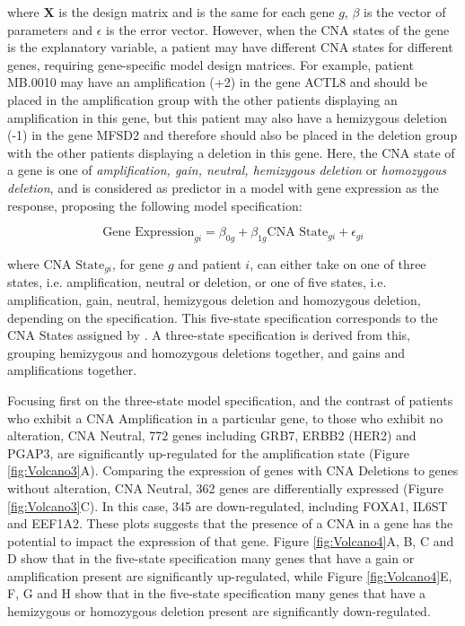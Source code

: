 where $\textbf{X}$ is the design matrix and is the same for each gene $g$, $\beta$ is the vector of parameters and $\epsilon$ is the error vector. However, when the CNA states of the gene is the explanatory variable, a patient may have different CNA states for different genes, requiring gene-specific model design matrices. For example, patient MB.0010 may have an amplification (+2) in the gene ACTL8 and should be placed in the amplification group with the other patients displaying an amplification in this gene, but this patient may also have a hemizygous deletion (-1) in the gene MFSD2 and therefore should also be placed in the deletion group with the other patients displaying a deletion in this gene. Here, the CNA state of a gene is one of \textit{amplification, gain, neutral, hemizygous deletion} or \textit{homozygous deletion}, and is considered as predictor in a model with gene expression as the response, proposing the following model specification: 

$$\text{Gene Expression}_{gi} = \beta_{0g} + \beta_{1g}\text{CNA State}_{gi} + \epsilon_{gi}$$ 

where $\text{CNA State}_{gi}$, for gene $g$ and patient $i$, can either take on one of three states, i.e. amplification, neutral or deletion, or one of five states, i.e. amplification, gain, neutral, hemizygous deletion and homozygous deletion, depending on the specification. This five-state specification corresponds to the CNA States assigned by \citep{pmid22522925}. A three-state specification is derived from this, grouping hemizygous and homozygous deletions together, and gains and amplifications together. 

Focusing first on the three-state model specification, and the contrast of patients who exhibit a CNA Amplification in a particular gene, to those who exhibit no alteration, CNA Neutral, 772 genes including GRB7, ERBB2 (HER2) and PGAP3, are significantly up-regulated for the amplification state (Figure \ref{fig:Volcano3}A). Comparing the expression of genes with CNA Deletions to genes without alteration, CNA Neutral, 362 genes are differentially expressed (Figure \ref{fig:Volcano3}C). In this case, 345 are down-regulated, including FOXA1, IL6ST and EEF1A2. These plots suggests that the presence of a CNA in a gene has the potential to impact the expression of that gene. Figure \ref{fig:Volcano4}A, B, C and D show that in the five-state specification many genes that have a gain or amplification present are significantly up-regulated, while Figure \ref{fig:Volcano4}E, F, G and H show that in the five-state specification many genes that have a hemizygous or homozygous deletion present are significantly down-regulated. 

